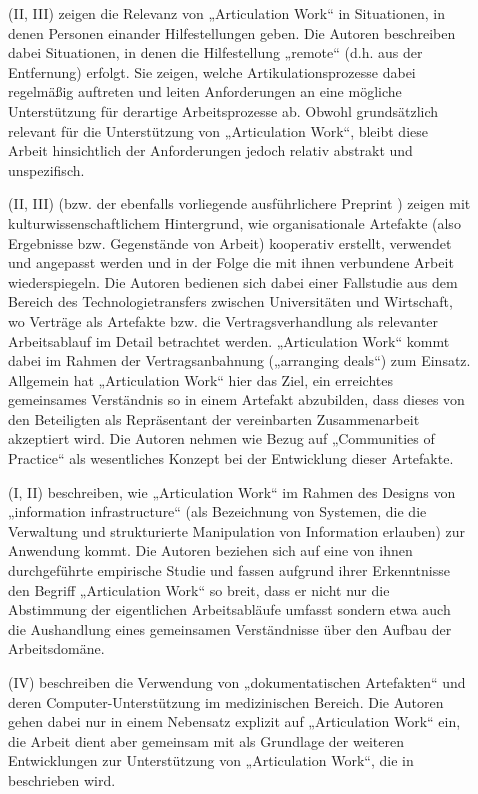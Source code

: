\begin{description}
	\item[\citet{Crabtree06}] (II, III) zeigen die Relevanz von „Articulation Work“ in Situationen, in denen Personen einander Hilfestellungen geben. Die Autoren beschreiben dabei Situationen, in denen die Hilfestellung „remote“ (d.h. aus der Entfernung) erfolgt. Sie zeigen, welche Artikulationsprozesse dabei regelmäßig auftreten und leiten Anforderungen an eine mögliche Unterstützung für derartige Arbeitsprozesse ab. Obwohl grundsätzlich relevant für die Unterstützung von „Articulation Work“, bleibt diese Arbeit hinsichtlich der Anforderungen jedoch relativ abstrakt und unspezifisch. 
	\item[\citet{Kaghan06}] (II, III) (bzw. der ebenfalls vorliegende ausführlichere Preprint \citep{Kaghan04}) zeigen mit kulturwissenschaftlichem Hintergrund, wie organisationale Artefakte (also Ergebnisse bzw. Gegenstände von Arbeit) kooperativ erstellt, verwendet und angepasst werden und in der Folge die mit ihnen verbundene Arbeit wiederspiegeln. Die Autoren bedienen sich dabei einer Fallstudie aus dem Bereich des Technologietransfers zwischen Universitäten und Wirtschaft, wo Verträge als Artefakte bzw. die Vertragsverhandlung als relevanter Arbeitsablauf im Detail betrachtet werden. „Articulation Work“ kommt dabei im Rahmen der Vertragsanbahnung („arranging deals“) zum Einsatz. Allgemein hat „Articulation Work“ hier das Ziel, ein erreichtes gemeinsames Verständnis so in einem Artefakt abzubilden, dass dieses von den Beteiligten als Repräsentant der vereinbarten Zusammenarbeit akzeptiert wird. Die Autoren nehmen wie \citet{Davenport02} Bezug auf „Communities of Practice“ als wesentliches Konzept bei der Entwicklung dieser Artefakte.
	\item[\citet{Baker07}] (I, II) beschreiben, wie „Articulation Work“ im Rahmen des Designs von „information infrastructure“ (als Bezeichnung von Systemen, die die Verwaltung und strukturierte Manipulation von Information erlauben) zur Anwendung kommt. Die Autoren beziehen sich auf eine von ihnen durchgeführte empirische Studie und fassen aufgrund ihrer Erkenntnisse den Begriff „Articulation Work“ so breit, dass er nicht nur die Abstimmung der eigentlichen Arbeitsabläufe umfasst sondern etwa auch die Aushandlung eines gemeinsamen Verständnisse über den Aufbau der Arbeitsdomäne. 
	\item[\citet{Cabitza07}] (IV) beschreiben die Verwendung von „dokumentatischen Artefakten“ und deren Computer-Unterstützung im medizinischen Bereich. Die Autoren gehen dabei nur in einem Nebensatz explizit auf „Articulation Work“ ein, die Arbeit dient aber gemeinsam mit \citet{Cabitza06} als Grundlage der weiteren Entwicklungen zur Unterstützung von „Articulation Work“, die in \citep{Cabitza09} beschrieben wird.

\end{description}
